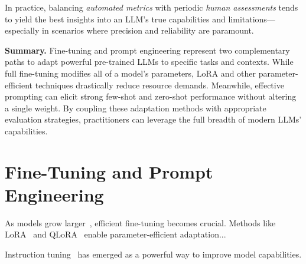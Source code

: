 \noindent
In practice, balancing \emph{automated metrics} with periodic \emph{human assessments} tends to yield the best insights into an LLM's true capabilities and limitations—especially in scenarios where precision and reliability are paramount.

\bigskip
\noindent
\textbf{Summary.} Fine-tuning and prompt engineering represent two complementary paths to adapt powerful pre-trained LLMs to specific tasks and contexts. While full fine-tuning modifies all of a model's parameters, LoRA and other parameter-efficient techniques drastically reduce resource demands. Meanwhile, effective prompting can elicit strong few-shot and zero-shot performance without altering a single weight. By coupling these adaptation methods with appropriate evaluation strategies, practitioners can leverage the full breadth of modern LLMs' capabilities. 

\section{Fine-Tuning and Prompt Engineering}
\label{sec:fine_tuning}

\noindent
As models grow larger~\cite{brown2020language}, efficient fine-tuning becomes crucial. Methods like LoRA~\cite{hu2021lora} and QLoRA~\cite{dettmers2023qlora} enable parameter-efficient adaptation...

Instruction tuning~\cite{ouyang2022training} has emerged as a powerful way to improve model capabilities.
